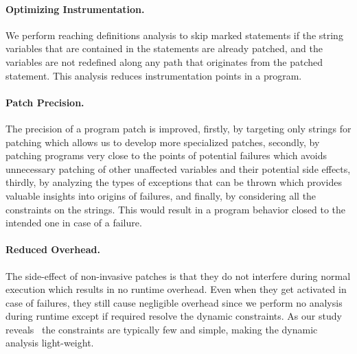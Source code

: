 {\paragraph{Optimizing Instrumentation.} We perform reaching definitions
analysis to skip marked statements
if the string variables that are contained in the statements are already
patched, and the variables
are not redefined along any path that originates from the patched statement.
This analysis reduces
instrumentation points in a program.

\paragraph{Patch Precision.} The precision of a program patch is improved,
firstly, by targeting only strings
for patching which allows us to develop more specialized patches, secondly, by
patching programs very
close to the points of potential failures which avoids unnecessary patching of
other
unaffected variables and their potential
side effects, thirdly, by analyzing the types of exceptions that can be thrown
which
provides valuable insights into
origins of failures, and finally, by considering all the constraints
on the strings. This would result
in a program behavior closed to the intended one in case of a failure.

\paragraph{Reduced Overhead.} The side-effect of non-invasive patches is that
they do not interfere during
normal execution which results in no runtime overhead. Even when they get
activated in case of failures,
they still cause negligible overhead since we perform no analysis during runtime
except if required resolve the dynamic constraints.
As our study reveals~ the constraints are typically few and
simple, making
the dynamic analysis light-weight.
}




















